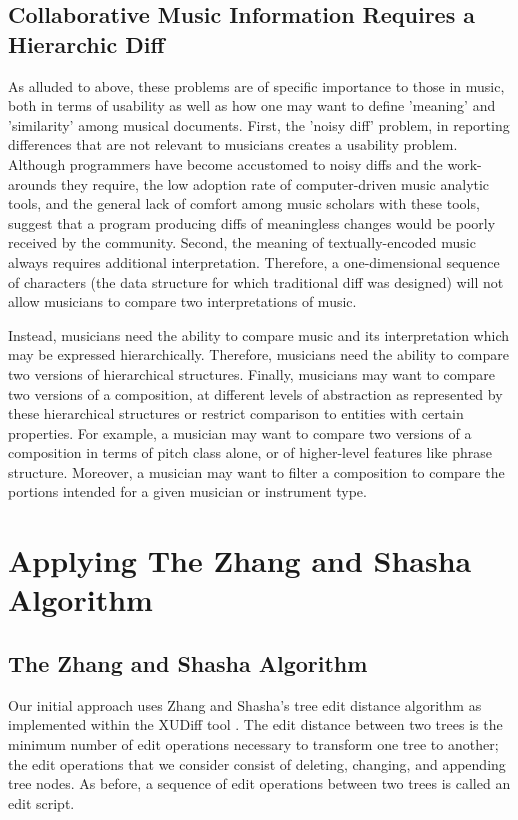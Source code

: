 \documentclass{article}
\begin{document}
\subsection{Collaborative Music Information Requires a Hierarchic Diff}
As alluded to above, these problems are of specific importance to
those in music, both in terms of usability as well as how one may want
to define 'meaning' and 'similarity' among musical documents.  First,
the 'noisy diff' problem, in reporting differences that are not
relevant to musicians creates a usability problem.  Although
programmers have become accustomed to noisy diffs and the work-arounds
they require, the low adoption rate of computer-driven music analytic
tools, and the general lack of comfort among music scholars with these
tools, suggest that a program producing diffs of meaningless changes
would be poorly received by the community.  Second, the meaning of
textually-encoded music always requires additional interpretation.
Therefore, a one-dimensional sequence of characters (the data
structure for which traditional diff was designed) will not allow
musicians to compare two interpretations of music.  

Instead, musicians
need the ability to compare music and its interpretation which may be
expressed hierarchically.  Therefore, musicians need the ability to
compare two versions of hierarchical structures.  Finally, musicians
may want to compare two versions of a composition, at different levels
of abstraction as represented by these hierarchical structures or
restrict comparison to entities with certain properties.  For example,
a musician may want to compare two versions of a composition in terms
of pitch class alone, or of higher-level features like phrase structure. Moreover, a musician may want to filter a composition to
compare the portions intended for a given musician or instrument type.

\section{Applying The Zhang and Shasha Algorithm}
\subsection{The Zhang and Shasha Algorithm}
Our initial approach uses Zhang and Shasha's tree edit distance
algorithm as implemented within the XUDiff tool \cite{Weaver:2013sl}.  The edit distance
between two trees is the minimum number of edit operations necessary
to transform one tree to another; the edit operations that we
consider consist of deleting, changing, and appending tree nodes. As
before, a sequence of edit operations between two trees is called an
edit script.
\end{document}
